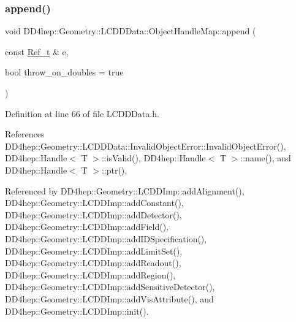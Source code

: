 \subsubsection{\texorpdfstring{append()}{append()}\hspace{0.1cm}{\footnotesize\ttfamily [1/2]}}
{\footnotesize\ttfamily void D\+D4hep\+::\+Geometry\+::\+L\+C\+D\+D\+Data\+::\+Object\+Handle\+Map\+::append (\begin{DoxyParamCaption}\item[{const \hyperlink{group___d_d4_h_e_p___g_e_o_m_e_t_r_y_ga40af83be6718bb8828a3d83dc7f8c930}{Ref\+\_\+t} \&}]{e,  }\item[{bool}]{throw\+\_\+on\+\_\+doubles = {\ttfamily true} }\end{DoxyParamCaption})\hspace{0.3cm}{\ttfamily [inline]}}



Definition at line 66 of file L\+C\+D\+D\+Data.\+h.



References D\+D4hep\+::\+Geometry\+::\+L\+C\+D\+D\+Data\+::\+Invalid\+Object\+Error\+::\+Invalid\+Object\+Error(), D\+D4hep\+::\+Handle$<$ T $>$\+::is\+Valid(), D\+D4hep\+::\+Handle$<$ T $>$\+::name(), and D\+D4hep\+::\+Handle$<$ T $>$\+::ptr().



Referenced by D\+D4hep\+::\+Geometry\+::\+L\+C\+D\+D\+Imp\+::add\+Alignment(), D\+D4hep\+::\+Geometry\+::\+L\+C\+D\+D\+Imp\+::add\+Constant(), D\+D4hep\+::\+Geometry\+::\+L\+C\+D\+D\+Imp\+::add\+Detector(), D\+D4hep\+::\+Geometry\+::\+L\+C\+D\+D\+Imp\+::add\+Field(), D\+D4hep\+::\+Geometry\+::\+L\+C\+D\+D\+Imp\+::add\+I\+D\+Specification(), D\+D4hep\+::\+Geometry\+::\+L\+C\+D\+D\+Imp\+::add\+Limit\+Set(), D\+D4hep\+::\+Geometry\+::\+L\+C\+D\+D\+Imp\+::add\+Readout(), D\+D4hep\+::\+Geometry\+::\+L\+C\+D\+D\+Imp\+::add\+Region(), D\+D4hep\+::\+Geometry\+::\+L\+C\+D\+D\+Imp\+::add\+Sensitive\+Detector(), D\+D4hep\+::\+Geometry\+::\+L\+C\+D\+D\+Imp\+::add\+Vis\+Attribute(), and D\+D4hep\+::\+Geometry\+::\+L\+C\+D\+D\+Imp\+::init().

\hypertarget{class_d_d4hep_1_1_geometry_1_1_l_c_d_d_data_1_1_object_handle_map_a11a8c4e48aa04381c284e803864a4947}{}\label{class_d_d4hep_1_1_geometry_1_1_l_c_d_d_data_1_1_object_handle_map_a11a8c4e48aa04381c284e803864a4947} 
